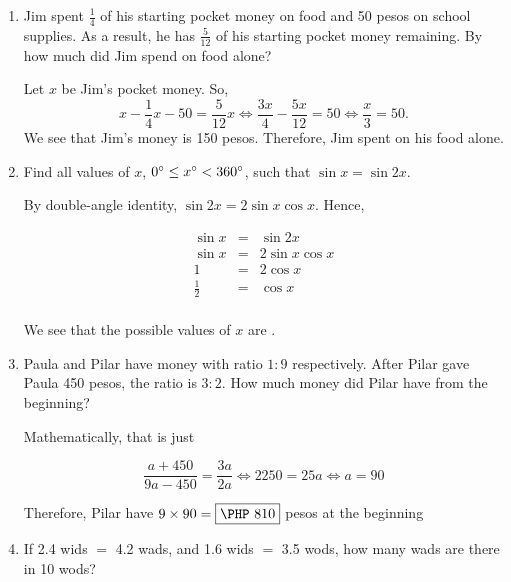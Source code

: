 \documentclass[11pt,paper={letter}]{scrartcl}
\begin{document}
\begin{enumerate}[label=\textbf{\arabic*}.]
\item Jim spent $\frac{1}{4}$ of his starting pocket money on food and 50 pesos on school supplies. As a result, he has $\frac{5}{12}$ of his starting pocket money remaining. By how much did Jim spend on food alone?


\sol Let $x$ be Jim's pocket money. So, $$x - \dfrac{1}{4}x - 50 = \dfrac{5}{12}x \Longleftrightarrow \dfrac{3x}{4} - \dfrac{5x}{12}  = 50 \Longleftrightarrow \dfrac{x}{3} = 50.$$ We see that Jim's money is 150 pesos. Therefore, Jim spent  on his food alone.

\item Find all values of $x$, $0^\circ \leq x^\circ < 360^\circ$, such that $\sin x = \sin 2x.$


\sol By double-angle identity, $\sin 2x = 2\sin x \cos x$. Hence, 

\begin{equation*}
    \begin{array}{rcl}
         \sin x & = & \sin2x \\
     \sin x    & = & 2\sin x \cos x  \\
     1    & = & 2\cos x  \\
     \frac{1}{2}    & = & \cos x  \\
         
    \end{array}
\end{equation*}

We see that the possible values of $x$ are . 
\item Paula and Pilar have money with ratio $1:9$ respectively. After Pilar gave Paula 450 pesos, the ratio is $3:2$. How much money did Pilar have from the beginning?


\sol Mathematically, that is just

\begin{equation*}
    \dfrac{a + 450}{9a - 450} = \dfrac{3a}{2a} \Longleftrightarrow 2250 = 25a \Longleftrightarrow a = 90
\end{equation*}

Therefore, Pilar have $9 \times 90 = \fbox{\PHP 810}$ pesos at the beginning
\item If 2.4 wids $=$ 4.2 wads, and 1.6 wids $=$ 3.5 wods, how many wads are there in 10 wods?


\end{enumerate}
\end{document}

